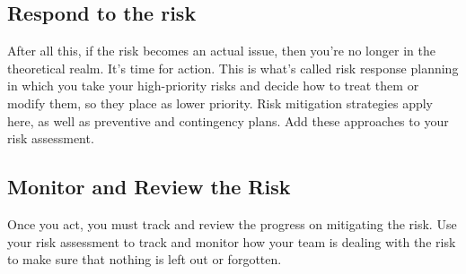 \documentclass[a4paper,12pt]{article}
\begin{document}
\subsection{Respond to the risk}
After all this, if the risk becomes an actual issue, then you’re no longer in the theoretical realm. It’s time for action. This is what’s called risk response planning in which you take your high-priority risks and decide how to treat them or modify them, so they place as lower priority. Risk mitigation strategies apply here, as well as preventive and contingency plans. Add these approaches to your risk assessment.

\subsection{Monitor and Review the Risk}
Once you act, you must track and review the progress on mitigating the risk. Use your risk assessment to track and monitor how your team is dealing with the risk to make sure that nothing is left out or forgotten.


\clearpage

\printindex
\end{document}
